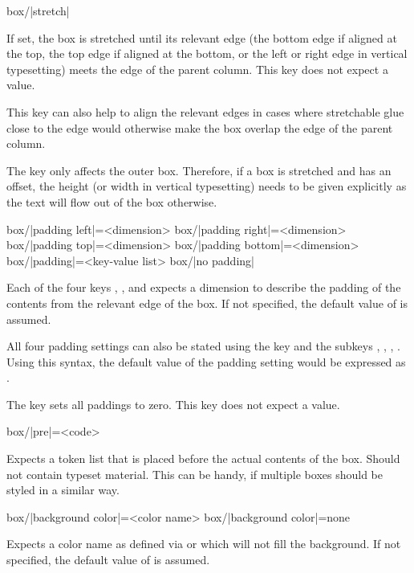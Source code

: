 \documentclass[a4paper]{article}
\begin{document}
\begin{macrodef}
box/|stretch|
\end{macrodef}
If set, the box is stretched until its relevant edge (the bottom edge if aligned at the top, the top edge if aligned at the bottom, or the left or right edge in vertical typesetting) meets the edge of the parent column. This key does not expect a value.

This key can also help to align the relevant edges in cases where stretchable glue close to the edge would otherwise make the box overlap the edge of the parent column.

\warning The  key only affects the outer box. Therefore, if a box is stretched and has an offset, the height (or width in vertical typesetting) needs to be given explicitly as the text will flow out of the box otherwise.

\begin{macrodef}
box/|padding left|={<dimension>}
box/|padding right|={<dimension>}
box/|padding top|={<dimension>}
box/|padding bottom|={<dimension>}
box/|padding|={<key-value list>}
box/|no padding|
\end{macrodef}
Each of the four keys , ,  and \newline {} expects a dimension to describe the padding of the contents from the relevant edge of the box. If not specified, the default value of \macro{7.5mm} is assumed.

All four padding settings can also be stated using the  key and the subkeys , , , . Using this syntax, the default value of the padding setting would be expressed as .

The key  sets all paddings to zero. This key does not expect a value.

\begin{macrodef}
box/|pre|={<code>}
\end{macrodef}
Expects a token list that is placed before the actual contents of the box. Should not contain typeset material. This can be handy, if multiple boxes should be styled in a similar way.

\begin{macrodef}
box/|background color|={<color name>}
box/|background color|={none}
\end{macrodef}
Expects a color name as defined via  or  which will not fill the background. If not specified, the default value of  is assumed.
\end{document}
